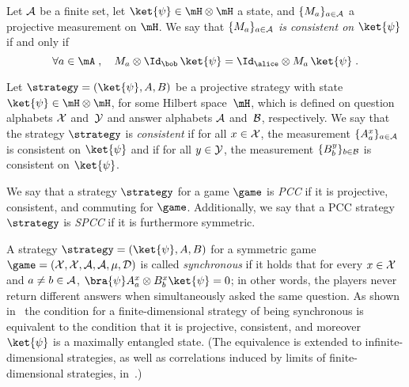 \begin{definition}
\hypertarget{000F}{}
\reversemarginpar{}
  \label{def:consistent-measurement}
  Let $\cal{A}$ be a finite set, let $\ket{\psi} \in \mH \otimes \mH$ a
  state, and $\{ M_a \}_{a \in \cal{A}}$ a projective measurement on
  $\mH$.
  We say that \emph{$\{M_a\}_{a \in \cal{A}}$ is consistent on $\ket{\psi}$} if
  and only if
  \begin{equation*}
    \forall a \in \mA\;,\quad M_a \otimes \Id_\bob\, \ket{\psi}
    = \Id_\alice \otimes M_a\, \ket{\psi}\;.
  \end{equation*}
\end{definition}

\begin{definition}
\hypertarget{000G}{}
\reversemarginpar{}
  \label{def:consistent-strategy}
	Let $\strategy = (\ket{\psi}, A, B)$ be a projective strategy with state
  $\ket{\psi} \in \mH \otimes \mH$, for some Hilbert space~$\mH$, which is
  defined on question alphabets $\cal{X}$ and~$\cal{Y}$ and answer alphabets
  $\cal{A}$ and~$\cal{B}$, respectively.
  We say that the strategy $\strategy$ is \emph{consistent} if for all $x \in
  \cal{X}$, the measurement $\{A^x_a\}_{a \in \cal{A}}$ is consistent on
  $\ket{\psi}$ and if for all $y \in \cal{Y}$, the measurement $\{B^y_b\}_{b \in
    \cal{B}}$ is consistent on $\ket{\psi}$.
\end{definition}

\begin{definition}
\hypertarget{000H}{}
\reversemarginpar{}
  \label{def:spcc}
  We say that a strategy $\strategy$ for a game $\game$ is \emph{PCC} if it is projective, consistent, and commuting for $\game$.
  Additionally, we say that a PCC strategy $\strategy$ is \emph{SPCC} if it is furthermore symmetric.
\end{definition}

\begin{remark}
  A strategy $\strategy = (\ket{\psi},A,B)$ for a symmetric game $\game =
  (\cal{X}, \cal{X}, \cal{A}, \cal{A}, \mu, D)$ is called \emph{synchronous} if
  it holds that for every $x\in \cal{X}$ and $a\neq b \in \cal{A}$, $\bra{\psi}
  A^x_a \otimes B^x_b \ket{\psi} = 0$; in other words,
  the players never return different answers when simultaneously asked the same
  question.
  As shown in~\cite{paulsen2016estimating} the condition for a
  finite-dimensional strategy of being synchronous is equivalent to the
  condition that it is projective, consistent, and moreover $\ket{\psi}$ is a
  maximally entangled state.
  (The equivalence is extended to infinite-dimensional strategies, as well as
  correlations induced by limits of finite-dimensional strategies,
  in~\cite{kim2018synchronous}.)
\end{remark}

